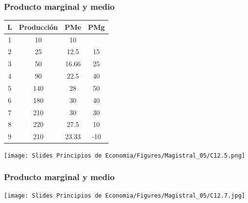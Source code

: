 \documentclass{beamer}
\begin{document}
\begin{frame}
\frametitle{Producto marginal y medio}
\begin{table}[h]
    \centering
    \begin{minipage}{0.45\textwidth}
    \renewcommand{\arraystretch}{1.3}
    \small
    \begin{tabular}{cccc}
        \hline
        \textbf{L} & \textbf{Producción} & \textbf{PMe} & \textbf{PMg} \\
        \hline
        1 & 10  & 10    &    \\
        2 & 25  & 12.5  & 15 \\
        3 & 50  & 16.66 & 25 \\
        4 & 90  & 22.5  & 40 \\
        5 & 140 & 28    & 50 \\
        6 & 180 & 30    & 40 \\
        7 & 210 & 30    & 30 \\
        8 & 220 & 27.5  & 10 \\
        9 & 210 & 23.33 & -10 \\
        \hline
    \end{tabular}
    \end{minipage}
    \begin{minipage}{0.45\textwidth}
        \centering
        \vspace{11mm}
        \texttt{[image: Slides Principios de Economia/Figures/Magistral\_05/C12.5.png]} 
    \end{minipage}
\end{table}
\end{frame}

\begin{frame}
    \frametitle{Producto marginal y medio}
    \centering
    \texttt{[image: Slides Principios de Economia/Figures/Magistral\_05/C12.7.jpg]}
\end{frame}
\end{document}
